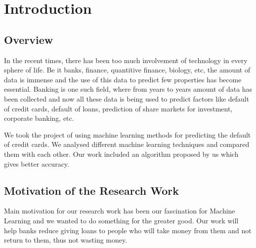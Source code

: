 \chapter{Introduction}\label{chap1}

\section{Overview}
\par In the recent times, there has been too much involvement of technology in every sphere of life. Be it banks, finance, quantitive finance, biology, etc, the amount of data is immense and the use of this data to predict few properties has become  essential. Banking is one such field, where from years to years amount of data has been collected and now all these data is being used to predict factors like default of credit cards, default of loans, prediction of share markets for investment, corporate banking, etc.\par We took the project of using machine learning methods for predicting the default of credit cards. We analysed different machine learning techniques and compared them with each other. Our work included an algorithm proposed by us which gives better accuracy.

\section{Motivation of the Research Work}\label{sec1.1}
Main motivation for our research work has been our fascination for Machine Learning and we wanted to do something for the greater good. Our work will help banks reduce giving loans to people who will take money from them and not return to them, thus not wasting money.

